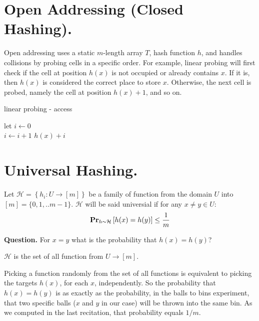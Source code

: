 \section{ Open Addressing (Closed Hashing).}
Open addressing uses a static $m$-length array $T$, hash function $h$, and handles collisions by probing cells in a specific order. For example, linear probing will first check if the cell at position $h(x)$ is not occupied or already contains $x$. If it is, then $h(x)$ is considered the correct place to store $x$. Otherwise, the next cell is probed, namely the cell at position $h(x)+1$, and so on.
  \begin{algorithm}
  \caption{linear probing - access}
  let $i \leftarrow 0 $ \\ 
   {
    $i \leftarrow i +1 $
  }
  \Return $h(x) + i$
  \end{algorithm}

\section{ Universal Hashing. } 



\begin{definition}
  Let $\mathcal{H} = \left\{ h_{i} : U \rightarrow [m] \right\}$ be a  family of function from the domain $U$ into $[m] = \{0, 1, .. m-1\} $. $\mathcal{H}$ will be said universial if for any $x\neq y \in U$: \begin{equation*}
    \begin{split}
      \prbm{h(x) = h(y)}{h \sim \mathcal{H}} \le \frac{1}{m}
    \end{split}
  \end{equation*}
\end{definition}
\textbf{Question.} For $x = y$ what is the probability that $h(x) = h(y)$? 

\begin{example}
  $\mathcal{H}$ is the set of all function from $U \rightarrow [m]$.

  Picking a function randomly from the set of all functions is equivalent to picking the targets $h(x)$, for each $x$, independently. So the probability that $h(x) = h(y)$ is as exactly as the probability, in the balls to bins experiment, that two specific balls ($x$ and $y$ in our case) will be thrown into the same bin. As we computed in the last recitation, that probability equals $1/m$.
\end{example}


